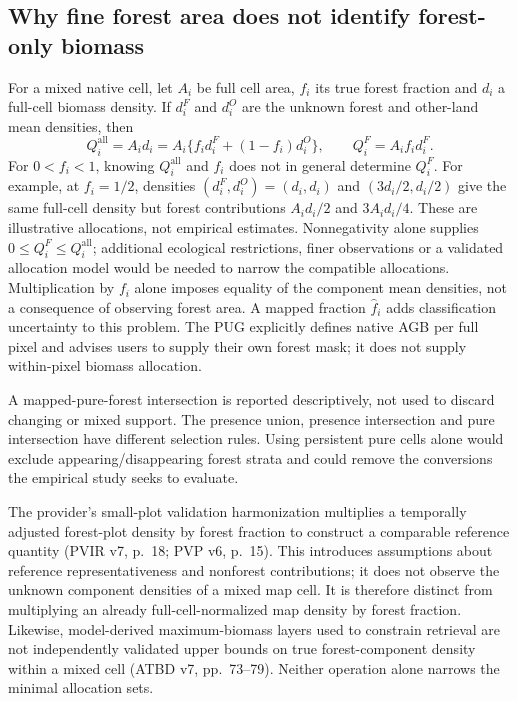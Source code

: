 \documentclass[11pt,a4paper]{article}
\begin{document}
\subsection{Why fine forest area does not identify forest-only biomass}
For a mixed native cell, let $A_i$ be full cell area, $f_i$ its true forest fraction and $d_i$ a full-cell biomass density. If $d_i^F$ and $d_i^O$ are the unknown forest and other-land mean densities, then
\begin{equation}
Q_i^{\mathrm{all}}=A_i d_i=A_i\{f_i d_i^F+(1-f_i)d_i^O\},\qquad Q_i^F=A_i f_i d_i^F.
\end{equation}
For $0<f_i<1$, knowing $Q_i^{\mathrm{all}}$ and $f_i$ does not in general determine $Q_i^F$. For example, at $f_i=1/2$, densities $(d_i^F,d_i^O)=(d_i,d_i)$ and $(3d_i/2,d_i/2)$ give the same full-cell density but forest contributions $A_i d_i/2$ and $3A_i d_i/4$. These are illustrative allocations, not empirical estimates. Nonnegativity alone supplies $0\le Q_i^F\le Q_i^{\mathrm{all}}$; additional ecological restrictions, finer observations or a validated allocation model would be needed to narrow the compatible allocations. Multiplication by $f_i$ alone imposes equality of the component mean densities, not a consequence of observing forest area. A mapped fraction $\widehat f_i$ adds classification uncertainty to this problem. The PUG explicitly defines native AGB per full pixel and advises users to supply their own forest mask; it does not supply within-pixel biomass allocation.

A mapped-pure-forest intersection is reported descriptively, not used to discard changing or mixed support. The presence union, presence intersection and pure intersection have different selection rules. Using persistent pure cells alone would exclude appearing/disappearing forest strata and could remove the conversions the empirical study seeks to evaluate.

The provider's small-plot validation harmonization multiplies a temporally adjusted forest-plot density by forest fraction to construct a comparable reference quantity (PVIR v7, p.~18; PVP v6, p.~15). This introduces assumptions about reference representativeness and nonforest contributions; it does not observe the unknown component densities of a mixed map cell. It is therefore distinct from multiplying an already full-cell-normalized map density by forest fraction. Likewise, model-derived maximum-biomass layers used to constrain retrieval are not independently validated upper bounds on true forest-component density within a mixed cell (ATBD v7, pp.~73--79). Neither operation alone narrows the minimal allocation sets.
\end{document}
